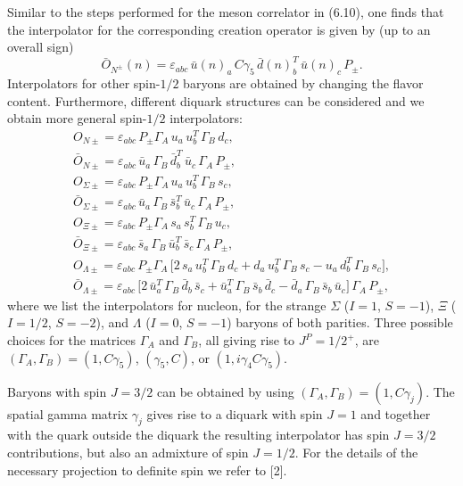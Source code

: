 Similar to the steps performed for the meson correlator in (6.10), one finds
that the interpolator for the corresponding creation operator is given by (up
to an overall sign)
\begin{equation}
  \bar{O}_{N^\pm}(n) = \varepsilon_{abc}\, \bar u(n)_a\, C\gamma_5\,
    \bar d(n)_b^T\, \bar u(n)_c\, P_\pm .
\end{equation}
Interpolators for other spin-$1/2$ baryons are obtained by changing the flavor
content. Furthermore, different diquark structures can be considered and we
obtain more general spin-$1/2$ interpolators:
\begin{equation}
  \begin{gathered}
    O_{N\pm} = \varepsilon_{abc}\, P_\pm \Gamma_A\, u_a\, u_b^T\, \Gamma_B\, d_c , \\
    \bar{O}_{N\pm} = \varepsilon_{abc}\, \bar u_a\, \Gamma_B\, \bar d_b^T\,
      \bar u_c\, \Gamma_A\, P_\pm , \\
    O_{\Sigma\pm} = \varepsilon_{abc}\, P_\pm \Gamma_A\, u_a\, u_b^T\,
      \Gamma_B\, s_c , \\
    \bar{O}_{\Sigma\pm} = \varepsilon_{abc}\, \bar u_a\, \Gamma_B\, \bar s_b^T\,
      \bar u_c\, \Gamma_A\, P_\pm , \\
    O_{\Xi\pm} = \varepsilon_{abc}\, P_\pm \Gamma_A\, s_a\, s_b^T\, \Gamma_B\,
      u_c , \\
    \bar{O}_{\Xi\pm} = \varepsilon_{abc}\, \bar s_a\, \Gamma_B\, \bar u_b^T\,
      \bar s_c\, \Gamma_A\, P_\pm , \\
    O_{\Lambda\pm} = \varepsilon_{abc}\, P_\pm \Gamma_A\,
      \bigl[ 2\, s_a\, u_b^T\, \Gamma_B\, d_c + d_a\, u_b^T\, \Gamma_B\, s_c
        - u_a\, d_b^T\, \Gamma_B\, s_c \bigr] , \\
    \bar{O}_{\Lambda\pm} = \varepsilon_{abc}\,
      \bigl[ 2\, \bar u_a^T\, \Gamma_B\, \bar d_b\, \bar s_c
        + \bar u_a^T\, \Gamma_B\, \bar s_b\, \bar d_c
        - \bar d_a\, \Gamma_B\, \bar s_b\, \bar u_c \bigr]\,
      \Gamma_A\, P_\pm ,
  \end{gathered}
\end{equation}
where we list the interpolators for nucleon, for the strange $\Sigma$ ($I = 1$,
$S = -1$), $\Xi$ ($I = 1/2$, $S = -2$), and $\Lambda$ ($I = 0$, $S = -1$)
baryons of both parities. Three possible choices for the matrices $\Gamma_A$
and $\Gamma_B$, all giving rise to $J^P = 1/2^+$, are $(\Gamma_A, \Gamma_B) =
(1, C\gamma_5)$, $(\gamma_5, C)$, or $(1, i\gamma_4 C\gamma_5)$.

Baryons with spin $J = 3/2$ can be obtained by using $(\Gamma_A, \Gamma_B) =
(1, C\gamma_j)$. The spatial gamma matrix $\gamma_j$ gives rise to a diquark
with spin $J = 1$ and together with the quark outside the diquark the resulting
interpolator has spin $J = 3/2$ contributions, but also an admixture of spin
$J = 1/2$. For the details of the necessary projection to definite spin we
refer to [2].

